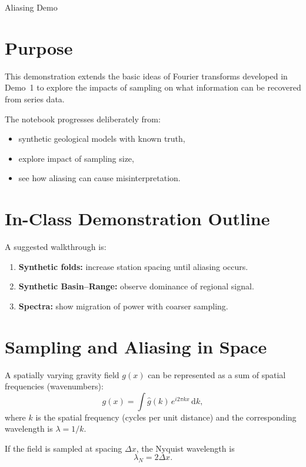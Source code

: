 \begin{activity}{Aliasing Demo}

\section*{Purpose}

This demonstration extends the basic ideas of Fourier transforms developed in Demo~1 to explore the impacts of sampling on what information can be recovered from series data.

The notebook progresses deliberately from:
\begin{itemize}
  \item synthetic geological models with known truth,
  \item explore impact of sampling size,
  \item see how aliasing can cause misinterpretation.
\end{itemize}

\section*{In-Class Demonstration Outline}

A suggested walkthrough is:

\begin{enumerate}
  \item \textbf{Synthetic folds:} increase station spacing until aliasing occurs.
  \item \textbf{Synthetic Basin--Range:} observe dominance of regional signal.
  \item \textbf{Spectra:} show migration of power with coarser sampling.
\end{enumerate}


\section*{Sampling and Aliasing in Space}

A spatially varying gravity field $g(x)$ can be represented as a sum of spatial
frequencies (wavenumbers):
\begin{equation}
g(x) = \int \hat{g}(k)\, e^{i 2\pi k x}\, \mathrm{d}k ,
\end{equation}
where $k$ is the spatial frequency (cycles per unit distance) and
the corresponding wavelength is $\lambda = 1/k$.

If the field is sampled at spacing $\Delta x$, the Nyquist wavelength is
\begin{equation}
\lambda_N = 2 \Delta x .
\end{equation}


\end{activity}
